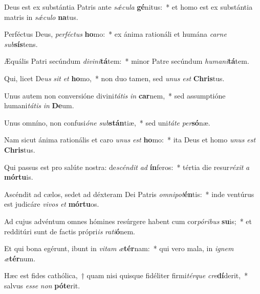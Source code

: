 \item Deus est ex substántia Patris ante \textit{sǽ}\textit{cu}\textit{la} \textbf{gé}nitus:~* et homo est ex substántia matris in \textit{sǽ}\textit{cu}\textit{lo} \textbf{na}tus.
\item Perféctus Deus, \textit{per}\textit{féc}\textit{tus} \textbf{ho}mo:~* ex ánima rationáli et humána \textit{car}\textit{ne} \textit{sub}\textbf{sís}tens.
\item Æquális Patri secúndum \textit{di}\textit{vi}\textit{ni}\textbf{tá}tem:~* minor Patre secúndum \textit{hu}\textit{ma}\textit{ni}\textbf{tá}tem.
\item Qui, licet De\textit{us} \textit{sit} \textit{et} \textbf{ho}mo,~* non duo tamen, sed \textit{u}\textit{nus} \textit{est} \textbf{Chris}tus.
\item Unus autem non conversióne divini\textit{tá}\textit{tis} \textit{in} \textbf{car}nem,~* sed assumptióne humani\textit{tá}\textit{tis} \textit{in} \textbf{De}um.
\item Unus omníno, non confusi\textit{ó}\textit{ne} \textit{sub}\textbf{stán}tiæ,~* sed uni\textit{tá}\textit{te} \textit{per}\textbf{só}næ.
\item Nam sicut ánima rationális et caro \textit{u}\textit{nus} \textit{est} \textbf{ho}mo:~* ita Deus et homo \textit{u}\textit{nus} \textit{est} \textbf{Chris}tus.
\item Qui passus est pro salúte nostra: de\textit{scén}\textit{dit} \textit{ad} \textbf{ín}feros:~* tértia die resur\textit{ré}\textit{xit} \textit{a} \textbf{mór}\textbf{tu}is.
\item Ascéndit ad cælos, sedet ad déxteram Dei Patris \textit{om}\textit{ni}\textit{pot}\textbf{én}tis:~* inde ventúrus est judicáre \textit{vi}\textit{vos} \textit{et} \textbf{mór}\textbf{tu}os.
\item Ad cujus advéntum omnes hómines resúrgere habent cum cor\textit{pó}\textit{ri}\textit{bus} \textbf{su}is;~* et redditúri sunt de factis própri\textit{is} \textit{ra}\textit{ti}\textbf{ó}nem.
\item Et qui bona egérunt, ibunt in \textit{vi}\textit{tam} \textit{æ}\textbf{tér}nam:~* qui vero mala, in \textit{i}\textit{gnem} \textit{æ}\textbf{tér}num.
\item Hæc est fides cathólica,~† quam nisi quisque fidéliter firmi\textit{tér}\textit{que} \textit{cre}\textbf{dí}derit,~* salvus \textit{es}\textit{se} \textit{non} \textbf{pót}\textbf{e}rit.
